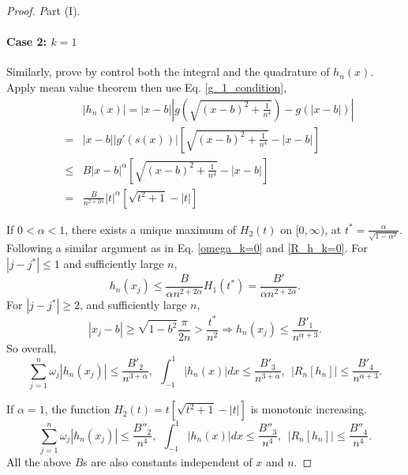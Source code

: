 \documentclass[11pt]{article}
\begin{document}
\begin{proof} {\textit Part (I).}
\paragraph{Case 2: $k=1$} Similarly, prove by control both the integral and the quadrature of $h_n(x)$. Apply mean value theorem then use Eq. \eqref{g_1_condition},
\begin{eqnarray}
    &&|h_n(x)|=|x-b|\left|g(\sqrt{(x-b)^2+\frac{1}{n^4}}) - g(|x-b|)\right| \\
    &=& |x-b| |g'(s(x))| \left[\sqrt{(x-b)^2+\frac{1}{n^4}} - |x-b| \right] \\
    &\leq& B |x-b|^{\alpha}\left[\sqrt{(x-b)^2+\frac{1}{n^4}} - |x-b| \right] \\
    &=& \frac{B}{ n^{2+2\alpha}} |t|^{\alpha}\left[\sqrt{t^2+1} - |t| \right] \label{h_n_k=1}
\end{eqnarray}

If $0<\alpha<1$, there exists a unique maximum of $H_2(t)$ on $[0,\infty)$, at $t^* = \frac{\alpha}{\sqrt{1-\alpha^2}}$. Following a similar argument as in Eq. \eqref{omega_k=0} and \eqref{R_h_k=0}. For $|j-j^*| \leq 1$ and sufficiently large $n$,
\begin{equation}
    h_n(x_j) \leq \frac{B}{\alpha n^{2+2\alpha}}H_1(t^*) = \frac{B'}{\alpha n^{2+2\alpha}}.
\end{equation}
For $|j-j^*|\geq 2$, and sufficiently large $n$,
\begin{equation}
     |x_j-b| \geq \sqrt{1-b^2}\frac{\pi}{2n} > \frac{t^*}{n^2} \Longrightarrow h_n(x_j) \leq 
        \frac{B'_1}{n^{\alpha+3}}.
\end{equation}
So overall,
\begin{equation}
     \sum_{j=1}^n \omega_j |h_n(x_j)| \leq \frac{B'_2}{n^{3+\alpha}}, \ \ \int_{-1}^1 |h_n(x)| dx \leq \frac{B'_3}{n^{3+\alpha}}, \ \ |R_n[h_n]| \leq \frac{B'_4}{n^{\alpha+3}}. \label{k1alpha<1}
\end{equation}

If $\alpha=1$, the function $H_2(t) =t\left[\sqrt{t^2+1} - |t| \right]$ is monotonic increasing.
\begin{equation}
    \sum_{j=1}^n \omega_j |h_n(x_j)| \leq \frac{B''_2}{n^{4}}, \ \ \int_{-1}^1 |h_n(x)| dx \leq \frac{B''_3}{n^{4}},\ \ |R_n[h_n]| \leq \frac{B''_4}{n^{4}}. \label{k1alpha=1}
\end{equation}
All the above $B$s are also constants independent of $x$ and $n$.


\end{proof}
\end{document}
